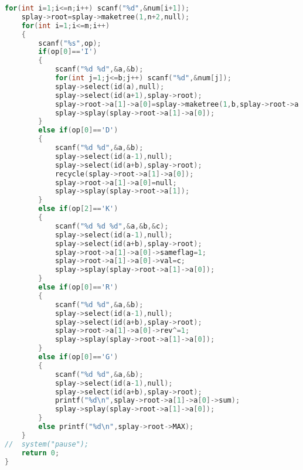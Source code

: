 \begin{lstlisting}[language=c++]
	for(int i=1;i<=n;i++) scanf("%d",&num[i+1]);
	splay->root=splay->maketree(1,n+2,null);
	for(int i=1;i<=m;i++)
	{
		scanf("%s",op);
		if(op[0]=='I')
		{
			scanf("%d %d",&a,&b);	
			for(int j=1;j<=b;j++) scanf("%d",&num[j]);
			splay->select(id(a),null);
			splay->select(id(a+1),splay->root);
			splay->root->a[1]->a[0]=splay->maketree(1,b,splay->root->a[1]);
			splay->splay(splay->root->a[1]->a[0]);
		}
		else if(op[0]=='D')
		{
			scanf("%d %d",&a,&b);
			splay->select(id(a-1),null);
			splay->select(id(a+b),splay->root);	
			recycle(splay->root->a[1]->a[0]);
			splay->root->a[1]->a[0]=null;
			splay->splay(splay->root->a[1]);
		}
		else if(op[2]=='K')
		{
			scanf("%d %d %d",&a,&b,&c);
			splay->select(id(a-1),null);
			splay->select(id(a+b),splay->root);
			splay->root->a[1]->a[0]->sameflag=1;
			splay->root->a[1]->a[0]->val=c;
			splay->splay(splay->root->a[1]->a[0]);	
		}
		else if(op[0]=='R')
		{
			scanf("%d %d",&a,&b);
			splay->select(id(a-1),null);
			splay->select(id(a+b),splay->root);
			splay->root->a[1]->a[0]->rev^=1;
			splay->splay(splay->root->a[1]->a[0]);
		}
		else if(op[0]=='G')
		{
			scanf("%d %d",&a,&b);
			splay->select(id(a-1),null);	
			splay->select(id(a+b),splay->root);
			printf("%d\n",splay->root->a[1]->a[0]->sum); 
			splay->splay(splay->root->a[1]->a[0]);
		}
		else printf("%d\n",splay->root->MAX);
	}	
//	system("pause");
	return 0;
}
    \end{lstlisting} 
